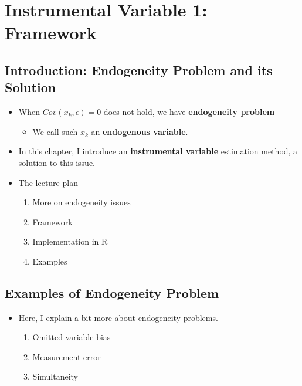 \documentclass[]{book}
\providecommand{\tightlist}{%
  \setlength{\itemsep}{0pt}\setlength{\parskip}{0pt}}
\begin{document}
\chapter{Instrumental Variable 1:
Framework}\label{instrumental-variable-1-framework}

\section{Introduction: Endogeneity Problem and its
Solution}\label{introduction-endogeneity-problem-and-its-solution}

\begin{itemize}
\tightlist
\item
  When \(Cov(x_k, \epsilon)=0\) does not hold, we have
  \textbf{endogeneity problem}

  \begin{itemize}
  \tightlist
  \item
    We call such \(x_k\) an \textbf{endogenous variable}.
  \end{itemize}
\item
  In this chapter, I introduce an \textbf{instrumental variable}
  estimation method, a solution to this issue.
\item
  The lecture plan

  \begin{enumerate}
  \def\labelenumi{\arabic{enumi}.}
  \tightlist
  \item
    More on endogeneity issues
  \item
    Framework
  \item
    Implementation in R
  \item
    Examples
  \end{enumerate}
\end{itemize}

\section{Examples of Endogeneity
Problem}\label{examples-of-endogeneity-problem}

\begin{itemize}
\tightlist
\item
  Here, I explain a bit more about endogeneity problems.

  \begin{enumerate}
  \def\labelenumi{\arabic{enumi}.}
  \tightlist
  \item
    Omitted variable bias
  \item
    Measurement error
  \item
    Simultaneity
  \end{enumerate}
\end{itemize}
\end{document}

